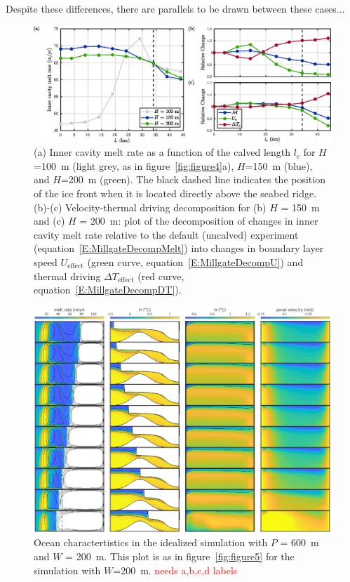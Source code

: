 \documentclass[draft]{agujournal2019}
\newcommand{\red}[1]{\textcolor{red}{#1}}
\begin{document}
Despite these differences, there are parallels to be drawn between these cases...

\begin{figure}
    \centering
    \includegraphics[width = \textwidth]{../make_figures/plots/figure6.eps}
    \caption{(a) Inner cavity melt rate as a function of the calved length $l_c$ for $H$=100~m (light grey, as in figure~\ref{fig:figure4}a), $H$=150~m (blue), and $H$=200~m (green). The black dashed line indicates the position of the ice front when it is located directly above the seabed ridge. (b)-(c) Velocity-thermal driving decomposition for (b) $H$ = 150~m and (c) $H$ = 200~m: plot of the decomposition of changes in inner cavity melt rate relative to the default (uncalved) experiment (equation~\eqref{E:MillgateDecompMelt}) into changes in boundary layer speed $U_\text{effect}$ (green curve, equation~\eqref{E:MillgateDecompU}) and thermal driving $\Delta T_{\text{effect}}$ (red curve, equation~\eqref{E:MillgateDecompDT}).}
    \label{fig:figure6}
\end{figure}

\begin{figure}
    \centering
    \includegraphics[width = \textwidth]{../make_figures/plots/figure7.eps}
    \caption{Ocean charactertistics in the idealized simulation with $P$ = 600~m and $W$ = 200~m. This plot is as in figure~\ref{fig:figure5} for the simulation with $W$=200~m. \red{needs a,b,c,d labels}}
    \label{fig:figure7}
\end{figure}
\end{document}
